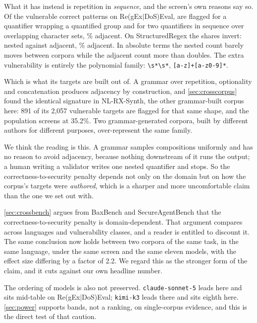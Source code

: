 \documentclass[11pt]{article}
\begin{document}
What it has instead is repetition in \emph{sequence}, and the screen's own
reasons say so. Of the vulnerable correct patterns on Re(gEx$|$DoS)Eval,
\renested{} are flagged for a quantifier wrapping a quantified group and
\readjacent{} for two quantifiers in sequence over overlapping character sets,
\readjacentpct{}\% adjacent. On StructuredRegex the shares invert:
\srnested{} nested against \sradjacent{} adjacent, \sradjacentpct{}\%
adjacent. In absolute terms the nested count barely moves between corpora
while the adjacent count more than doubles. The extra vulnerability is
entirely the polynomial family: \texttt{\textbackslash s*\textbackslash s*},
\texttt{[a-z]+[a-z0-9]*}.

Which is what its targets are built out of. A grammar over repetition,
optionality and concatenation produces adjacency by construction, and
\cref{sec:crosscorpus} found the identical signature in NL-RX-Synth, the
other grammar-built corpus here: 891 of its 2{,}057 vulnerable targets are
flagged for that same shape, and the population screens at 35.2\%. Two
grammar-generated corpora, built by different authors for different purposes,
over-represent the same family.

We think the reading is this. A grammar samples compositions uniformly and has
no reason to avoid adjacency, because nothing downstream of it runs the
output; a human writing a validator writes one nested quantifier and stops.
So the correctness-to-security penalty depends not only on the domain but on
how the corpus's targets were \emph{authored}, which is a sharper and more
uncomfortable claim than the one we set out with.

\cref{sec:crossbench} argues from BaxBench and SecureAgentBench that the
correctness-to-security penalty is domain-dependent. That argument compares
across languages and vulnerability classes, and a reader is entitled to
discount it. The same conclusion now holds between two corpora of the same
task, in the same language, under the same screen and the same eleven
models, with the effect size differing by a factor of 2.2. We regard this as
the stronger form of the claim, and it cuts against our own headline number.

The ordering of models is also not preserved. \texttt{claude-sonnet-5} leads
here and sits mid-table on Re(gEx$|$DoS)Eval; \texttt{kimi-k3} leads there
and sits eighth here. \cref{sec:power} supports bands, not a ranking, on
single-corpus evidence, and this is the direct test of that caution.
\end{document}
